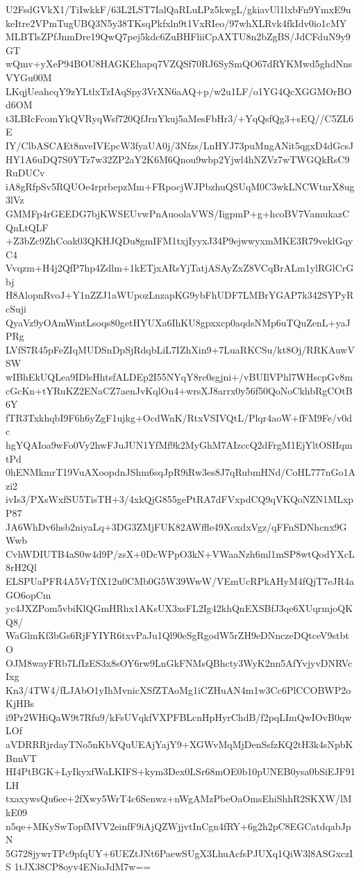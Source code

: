 U2FsdGVkX1/TiIwkkF/63L2LST7IalQaRLuLPz5kwgL/gkiavUl1lxbFn9YmxE9u
keItre2VPmTugUBQ3N5y38TKsqPkfxln9t1VxRIeo/97whXLRvk4fkIdv0io1cMY
MLBTlsZPfJnmDre19QwQ7pej5kdc6ZuBHFliiCpAXTU8n2bZgBS/JdCFduN9y9GT
wQmv+yXeP94BOU8HAGKEhapq7VZQSf70RJ6SySmQO67dRYKMwd5ghdNnsVYGu00M
LKqjUeahcqY9zYLtlxTzIAqSpy3VrXN6aAQ+p/w2u1LF/o1YG4QcXGGMOrBOd6OM
t3LBIcFcomYkQVRyqWsf720QfJrnYkuj5aMesFbHr3/+YqQsfQg3+sEQ//C5ZL6E
IY/ClbASCAEt8nveIVEpcW3fyaUA0j/3Nfzs/LnHYJ73puMngANit5qgxD4dGcsJ
HY1A6uDQ7S0YTz7w32ZP2aY2K6M6Qnou9wbp2Yjwl4hNZVz7wTWGQkRsC9RuDUCv
iA8gRfpSv5RQUOe4rprbepzMm+FRpocjWJPbzhuQSUqM0C3wkLNCWtnrX8ug3lVz
GMMFp4rGEEDG7bjKWSEUvwPnAuoolaVWS/IigpmP+g+hcoBV7VamukazCQnLtQLF
+Z3bZc9ZhCoak03QKHJQDu8gmIFM1txjIyyxJ34P9ejwwyxmMKE3R79veklGqyC4
Vvqzm+H4j2QfP7hp4Zdlm+1kETjxARsYjTatjASAyZxZ8VCqBrALm1ylRGlCrGbj
H8AlopnRvoJ+Y1nZZJ1aWUpozLnzapKG9ybFhUDF7LMBrYGAP7k342SYPyRcSuji
QyaVz9yOAmWmtLsoqs80getHYUXa6IhKU8gpxxcp0aqdsNMp6uTQuZenL+yaJPRg
LVfS7R45pFeZIqMUDSnDpSjRdqbLiL7IZhXin9+7LuaRKCSu/kt8Oj/RRKAuwVSW
wIBhEkUQLea9IDlsHhtsfALDEp2I55NYqY8rc0sgjni+/vBUIlVPhl7WHscpGv8m
cGcKn+tYRuKZ2ENaCZ7aenJvKqlOn4+wrsXJ8arrx0y56f50QoNoCkhbRgCOtB6Y
fTR3TxkhqbI9F6h6yZgF1ujkg+OcdWnK/RtxVSIVQtL/Plqr4aoW+fFM9Fe/v0dc
hgYQAIoa9wFo0Vy2hwFJuJUN1YfMf9k2MyGhM7AIzccQ2dFrgM1EjYltOSHqmtPd
0hENMkmrT19VuAXoopdnJShm6sqJpR9iRw3es8J7qRubmHNd/CoHL777nGo1Azi2
ivIs3/PXsWxfSU5TisTH+3/4xkQjG855gePtRA7dFVxpdCQ9qVKQoNZN1MLxpP87
JA6WhDv6hsb2niyaLq+3DG3ZMjFUK82AWffle49XoxdxVgz/qFFnSDNhcnx9GWwb
CvhWDIUTB4aS0w4d9P/zsX+0DcWPpO3kN+VWaaNzh6ml1mSP8wtQodYXcL8rH2Ql
ELSPUaPFR4A5VrTfX12u0CMb0G5W39WwW/VEmUcRPkAHyM4fQjT7eJR4aGO6opCm
yc4JXZPom5vbiKlQGmHRhx1AKsUX3xsFL2Ig42khQnEXSBfJ3qe6XUqrmjoQKQ8/
WaGlmKf3bGs6RjFYIYR6txvPaJu1Ql90eSgRgodW5rZH9eDNnczeDQtceV9stbtO
OJM8wayFRb7LfIzES3x8sOY6rw9LnGkFNMsQBhcty3WyK2nn5AfYvjyvDNRVcIxg
Kn3/4TW4/fLJAbO1yIhMvnicXSfZTAoMg1iCZHuAN4m1w3Cc6PlCCOBWP2oKjHBs
i9Pr2WHiQaW9t7Rfu9/kFsUVqkfVXPFBLcnHpHyrChdB/f2pqLImQwIOvB0qwLOf
aVDRRRjrdayTNo5nKbVQuUEAjYajY9+XGWvMqMjDenSsfzKQ2tH3k4sNpbKBnnVT
HI4PtBGK+LyIkyxfWaLKIFS+kym3Dex0LSr68mOE0b10pUNEB0ysa0bSiEJF91LH
txaxywsQu6ee+2fXwy5WrT4c6Senwz+nWgAMzPbeOaOmsEhiShhR2SKXW/lMkE09
n5qe+MKySwTopfMVV2einfF9iAjQZWjjvtInCgn4fRY+6g2h2pC8EGCatdqabJpN
5G728jywrTPc9pfqUY+6UEZtJNt6PaewSUgX3LhuAcfsPJUXq1QiW3l8ASGxczIS
1tJX38CP8oyv4ENioJdM7w==
